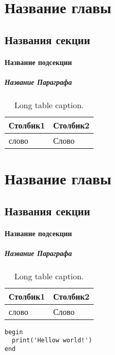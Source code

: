 \chapter{Название главы}
  \section{Названия секции}
    \subsubsection{Название подсекции}
      \paragraph{Название Параграфа}
        \lipsum[2]\cite{BibExampleRU}
        \begin{center}
          \begin{xltabular}{\linewidth}{|l|X|}
            \caption{Long table caption.\label{long}}                                                                                                    \\
            \hline
            Столбик1  & Столбик2    \\
            \hline
            слово     & Слово       \\
            \hline
          \end{xltabular}
        \end{center}


\chapter{Название главы}
  \section{Названия секции}
    \subsubsection{Название подсекции}
      \paragraph{Название Параграфа}
        \lipsum[2]\cite{BibExampleRU}

        \begin{center}
          \begin{xltabular}{\linewidth}{|l|X|}
            \caption{Long table caption.\label{long}}                                                                                                    \\
            \hline
            Столбик1  & Столбик2    \\
            \hline
            слово     & Слово       \\
            \hline
          \end{xltabular}
        \end{center}

        \begin{lstlisting}[caption={Название листинга}]
begin
  print('Hellow world!')
end
        \end{lstlisting}
